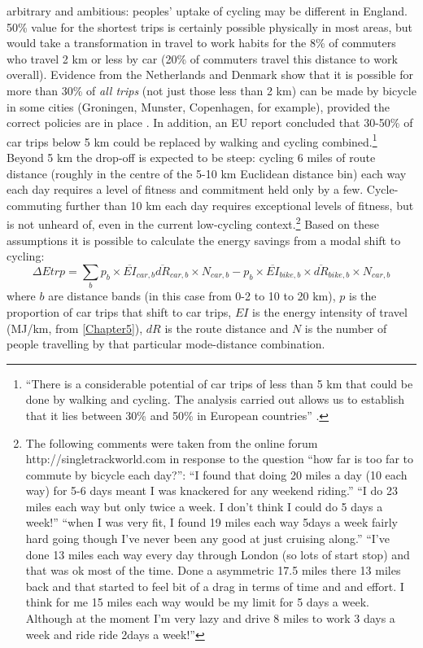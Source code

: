 arbitrary and ambitious: peoples' uptake of cycling may be different in England.
50\% value for the shortest trips is certainly possible physically in most
areas, but would
take a transformation in travel to work habits for the 8\% of commuters who
travel 2 km or less by car (20\% of commuters travel this distance to work
overall). Evidence from the Netherlands and Denmark show that it
is possible for more than 30\% of \emph{all trips} (not just those less than 2
km) can be made by bicycle in some cities (Groningen, Munster, Copenhagen,
for example), provided the correct policies are in place \citep{Rietveld2004,
Pucher2010}.
In addition, an EU report concluded that 30-50\% of car trips below
5 km could be replaced by walking and cycling
combined.\footnote{``There
is a considerable potential of car trips of less than 5 km that could be
done by walking and cycling. The analysis carried out allows us to establish
that it lies between 30\% and 50\% in European countries''
\citep[p.~60]{Gnavi1999walcying}.
}
Beyond 5 km the drop-off is expected to be steep: cycling 6 miles of route
distance (roughly in the centre of the 5-10 km Euclidean distance bin) each way
each day requires a level of fitness and commitment held only by a few.
Cycle-commuting further than 10 km each day requires exceptional levels of
fitness, but is not unheard of, even in the current low-cycling
context.\footnote{The following comments
were taken from the online forum http://singletrackworld.com in response to
the question ``how far is too far to commute by bicycle each day?'': ``I found
that doing 20 miles a day (10 each way) for 5-6 days meant I was knackered for
any weekend riding.'' ``I do 23 miles each way but only twice a week. I don't
think I could do 5 days a week!''  ``when I was very fit, I found 19 miles each
way 5days a week fairly hard going though I've never been any good at just
cruising along.'' ``I've done 13 miles each way every day through London (so
lots of start stop) and that was ok most of the time. Done a asymmetric 17.5
miles there 13 miles back and that started to feel bit of a drag in terms of
time and and effort. I think for me 15 miles each way would be my limit for 5
days a week.
Although at the moment I'm very lazy and drive 8 miles to work 3 days a week and
ride ride 2days a week!''
}
Based on these assumptions it is possible to calculate the energy savings from
a modal shift to cycling:
\begin{equation}
 \Delta Etrp = \sum_{b} p_b \times \overline{EI}_{car,b}
\overline{dR}_{car,b} \times N_{car,b} - p_b \times \overline{EI}_{bike,b}
\times \overline{dR}_{bike,b} \times N_{car,b}
\end{equation}
where $b$ are distance bands (in this case from 0-2 to 10 to 20 km), $p$ is
the proportion of car trips that shift to car trips, $EI$ is the energy
intensity of travel (MJ/km, from \cref{Chapter5}), $dR$ is the route distance
and $N$ is the number of people travelling by that particular mode-distance
combination. 

